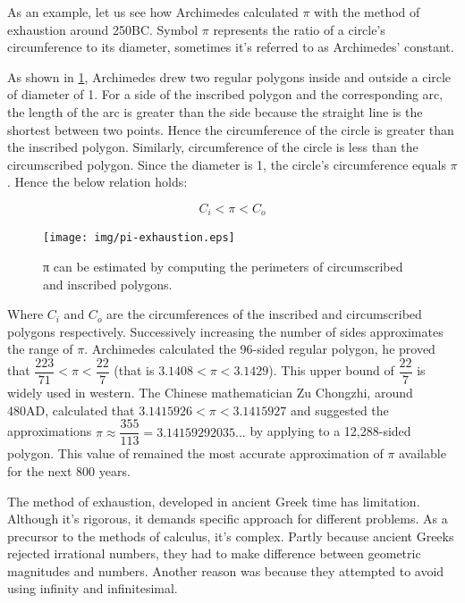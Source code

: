 \documentclass{article}
\begin{document}

As an example, let us see how Archimedes calculated $\pi$ with the method of exhaustion around 250BC. Symbol $\pi$ represents the ratio of a circle's circumference to its diameter, sometimes it's referred to as Archimedes' constant.

As shown in \ref{fig:pi-exhaustion}, Archimedes drew two regular polygons inside and outside a circle of diameter of 1. For a side of the inscribed polygon and the corresponding arc, the length of the arc is greater than the side because the straight line is the shortest between two points. Hence the circumference of the circle is greater than the inscribed polygon. Similarly, circumference of the circle is less than the circumscribed polygon. Since the diameter is 1, the circle's circumference equals $\pi$. Hence the below relation holds:

\[
  C_i < \pi < C_o
\]

\begin{figure}[htbp]
 \centering
 \texttt{[image: img/pi-exhaustion.eps]}
 \caption{π can be estimated by computing the perimeters of circumscribed and inscribed polygons.}
 \label{fig:pi-exhaustion}
\end{figure}

Where $C_i$ and $C_o$ are the circumferences of the inscribed and circumscribed polygons respectively. Successively increasing the number of sides approximates the range of $\pi$. Archimedes calculated the 96-sided regular polygon, he proved that $\dfrac{223}{71} < \pi < \dfrac{22}{7}$ (that is $3.1408 < \pi < 3.1429$). This upper bound of $\dfrac{22}{7}$ is widely used in western. The Chinese mathematician Zu Chongzhi, around 480AD, calculated that $3.1415926 < \pi < 3.1415927$ and suggested the approximations $\pi \approx \dfrac{355}{113} = 3.14159292035...$ by applying to a 12,288-sided polygon. This value of remained the most accurate approximation of $\pi$ available for the next 800 years.

The method of exhaustion, developed in ancient Greek time has limitation. Although it's rigorous, it demands specific approach for different problems. As a precursor to the methods of calculus, it's complex. Partly because ancient Greeks rejected irrational numbers, they had to make difference between geometric magnitudes and numbers. Another reason was because they attempted to avoid using infinity and infinitesimal.
\end{document}
